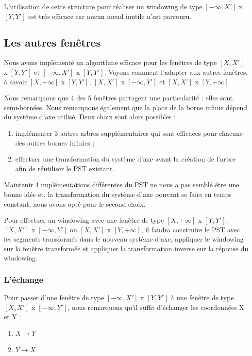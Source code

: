 \documentclass[10pt,a4paper]{article}
\begin{document}
L'utilisation de cette structure pour réaliser un windowing de type $[-\infty, X']$ x $[Y, Y']$ est très efficace car aucun nœud inutile n'est parcouru.


\subsection{Les autres fenêtres}
Nous avons implémenté un algorithme efficace pour les fenêtres de type $[X, X']$ x $[Y, Y']$ et $[-\infty, X']$ x $[Y, Y']$. Voyons comment l'adapter aux autres fenêtres, à savoir $[X, +\infty]$ x $[Y, Y']$, $[X, X']$ x $[-\infty, Y']$ et $[X, X']$ x $[Y, +\infty]$.

Nous remarquons que 4 des 5 fenêtres partagent une particularité :  elles sont semi-bornées. Nous remarquons également que la place de la borne infinie dépend du système d'axe utilisé. Deux choix sont alors possibles :
\begin{enumerate}
	\item implémenter 3 autres arbres supplémentaires qui sont efficaces pour chacune des autres bornes infinies ;
	\item effectuer une transformation du système d'axe avant la création de l'arbre afin de réutiliser le PST existant.
\end{enumerate}

Maintenir 4 implémentations différentes du PST ne nous a pas semblé être une bonne idée et, la transformation du système d'axe pouvant se faire en temps constant, nous avons opté pour le second choix.

Pour effectuer un windowing avec une fenêtre de type $[X, +\infty]$ x $[Y, Y']$, $[X, X']$ x $[-\infty, Y']$ ou $[X, X']$ x $[Y, +\infty]$, il faudra construire le PST avec les segments transformés dans le nouveau système d'axe, appliquer le windowing sur la fenêtre transformée et appliquer la transformation inverse sur la réponse du windowing.

\subsubsection{L'échange}
Pour passer d'une fenêtre de type $[-\infty, X']$ x $[Y, Y']$ à une fenêtre de type $[X, X']$ x $[-\infty, Y']$, nous remarquons qu'il suffit d'échanger les coordonnées X et Y :
\begin{enumerate}
	\item $X \rightarrow Y$
	\item $Y \rightarrow X$
\end{enumerate}
\end{document}
